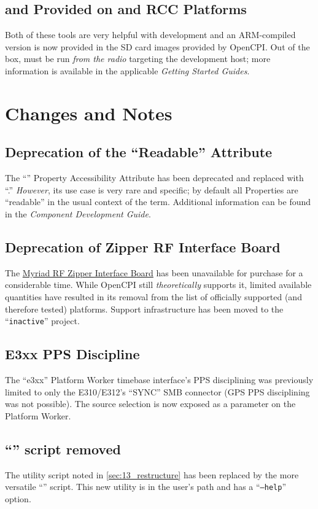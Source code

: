 \subsection{ and  Provided on  and  RCC Platforms} %
Both of these tools are very helpful with development and an ARM-compiled version is now provided in the SD card images provided by OpenCPI. Out of the box,  must be run \textit{from the radio} targeting the development host; more information is available in the applicable \textit{Getting Started Guides}.
\section{Changes and Notes}
\subsection{Deprecation of the ``Readable'' Attribute}
\label{sec:15_readable}
The ``'' Property Accessibility Attribute has been deprecated and replaced with ``.'' \textit{However}, its use case is very rare and specific; by default all Properties are ``readable'' in the usual context of the term.
Additional information can be found in the \textit{Component Development Guide}.

\subsection{Deprecation of Zipper RF Interface Board}
\label{sec:15_zipper} %
The \href{https://wiki.myriadrf.org/Zipper_Interface_Board}{Myriad RF Zipper Interface Board} has been unavailable for purchase for a considerable time. While OpenCPI still \textit{theoretically} supports it, limited available quantities have resulted in its removal from the list of officially supported (and therefore tested) platforms. Support infrastructure has been moved to the ``\texttt{inactive}'' project.
\subsection{E3xx PPS Discipline}
\label{sec:15_e3xx_gps} %
The ``e3xx'' Platform Worker timebase interface's PPS disciplining was previously limited to only the E310/E312's ``SYNC'' SMB connector (GPS PPS disciplining was not possible). The source selection is now exposed as a parameter on the Platform Worker.
\subsection{``'' script removed} %
\label{sec:15_new_project_source}
The utility script noted in \ref{sec:13_restructure} has been replaced by the more versatile ``'' script. This new utility is in the user's path and has a ``\texttt{--help}'' option.

